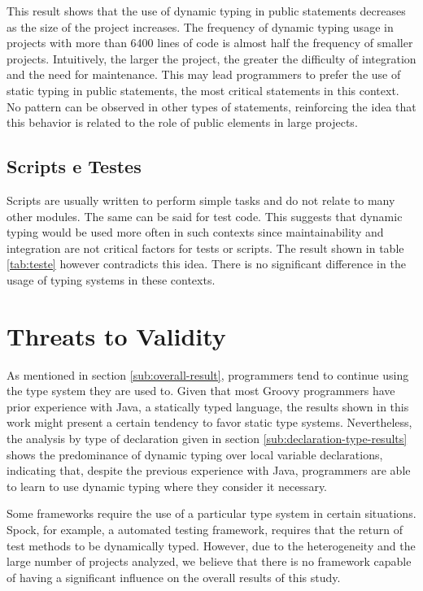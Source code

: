 \documentclass[preprint]{sigplanconf}
\begin{document}
This result shows that the use of dynamic typing in public statements decreases as the size of the project
increases. 
The frequency of dynamic typing usage in projects with more than 6400 lines of code is almost half the frequency of smaller projects.
Intuitively, the larger the project, the greater the difficulty of integration and the need for maintenance.
This may lead programmers to prefer the use of static typing in public statements, the most critical  statements in this context.
No pattern can be observed in other types of statements, reinforcing the idea that this behavior is related to the role of public elements in large projects.

\subsection{Scripts e Testes\label{sub:Scripts-e-Testes}}
Scripts are usually written to perform simple tasks and do not relate to many other modules. 
The same can be said for test code. 
This suggests that dynamic typing would be used more often in such contexts since maintainability and integration are not critical factors for tests or scripts. 
The result shown in table \ref{tab:teste} however contradicts this idea.
There is no significant difference in the usage of typing systems in these contexts.


\section{Threats to Validity\label{sec:ameaca}}
As mentioned in section \ref{sub:overall-result}, programmers tend to continue using the type system they are used to.
Given that most Groovy programmers have prior experience with Java, a statically typed language, the results shown in this work might present a certain tendency to favor static type systems. 
Nevertheless, the analysis by type of declaration given in section \ref{sub:declaration-type-results} shows the predominance of dynamic typing over local variable declarations, indicating that, despite the previous experience with Java,
programmers are able to learn to use dynamic typing where they consider it necessary.

Some frameworks require the use of a particular type system in certain situations. 
Spock, for example, a automated testing framework, requires that the return of test methods to be dynamically typed. 
However, due to the heterogeneity and the large number of projects analyzed, we believe that there is no framework capable of having a significant influence on the overall results of this study.
\end{document}
